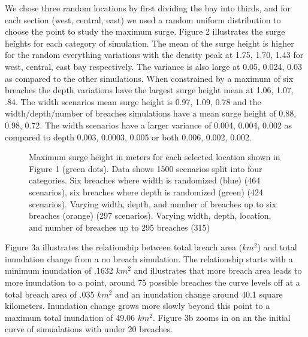 \documentclass{coastal_paper}
\begin{document}
We chose three random locations by first dividing the bay into thirds, and for each section (west, central, east) we used a random uniform distribution to choose the point to study the maximum surge. Figure 2 illustrates the surge heights for each category of simulation. The mean of the surge height is higher for the random everything variations with the density peak at 1.75, 1.70, 1.43 for west, central, east bay respectively. The variance is also large at 0.05, 0.024, 0.03 as compared to the other simulations. When constrained by a maximum of six breaches the depth variations have the largest surge height mean at 1.06, 1.07, .84. The width scenarios mean surge height is 0.97, 1.09, 0.78 and the width/depth/number of breaches simulations have a mean surge height of 0.88, 0.98, 0.72. The width scenarios have a larger variance of 0.004, 0.004, 0.002 as compared to depth 0.003, 0.0003, 0.005 or both 0.006, 0.002, 0.002. 

\begin{figure}[ht]
    \centering
    \resizebox{\textwidth}{!}{%
            
        }
    \caption{Maximum surge height in meters for each selected location shown in Figure 1 (green dots). Data shows 1500 scenarios split into four categories. Six breaches where width is randomized (blue) (464 scenarios), six breaches where depth is randomized (green) (424 scenarios). Varying width, depth, and number of breaches up to six breaches (orange) (297 scenarios). Varying width, depth, location, and number of breaches up to 295 breaches (315)}
    \label{fig2}
    \end{figure}

Figure 3a illustrates the relationship between total breach area ($km^2$) and total inundation change from a no breach simulation. The relationship starts with a minimum inundation of .1632 $km^2$ and illustrates that more breach area leads to more inundation to a point, around 75 possible breaches the curve levels off at a total breach area of .035 $km^2$ and an inundation change around 40.1 square kilometers. Inundation change grows more slowly beyond this point to a maximum total inundation of 49.06 $km^2$. Figure 3b zooms in on an the initial curve of simualations with under 20 breaches.  
\end{document}
